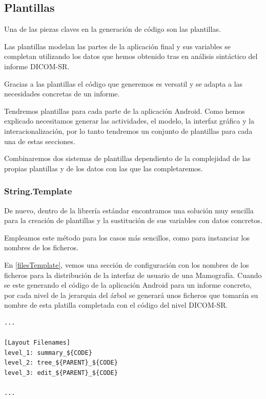 \subsection{Plantillas}\label{sec:templates}
Una de las piezas claves en la generación de código son las plantillas.\par
Las plantillas modelan las partes de la aplicación final y sus variables se completan utilizando los datos que hemos obtenido tras en análisis sintáctico del informe DICOM-SR.\medskip\par

Gracias a las plantillas el código que generemos es versatil y se adapta a las necesidades concretas de un informe. \par
Tendremos plantillas para cada parte de la aplicación Android. Como hemos explicado necesitamos generar las actividades, el modelo, la interfaz gráfica y la interacionalización, por lo tanto tendremos un conjunto de plantillas para cada una de estas secciones.\medskip\par

Combinaremos dos sistemas de plantillas dependiento de la complejidad de las propias plantillas y de los datos con las que las completaremos.\par

\subsubsection{String.Template}
De nuevo, dentro de la librería estándar encontramos una solución muy sencilla para la creación de plantillas y la sustitución de sus variables con datos concretos.\par
Empleamos este método para los casos más sencillos, como para instanciar los nombres de los ficheros.\medskip\par
En \ref{filesTemplate}, vemos una sección de configuración con los nombres de los ficheros para la distribución de la interfaz de usuario de una Mamografía. Cuando se este generando el código de la aplicación Android para un informe concreto, por cada nivel de la jerarquia del árbol se generará unos ficheros que tomarán su nombre de esta platilla completada con el código del nivel DICOM-SR.\par

\begin{lstlisting}[label=filesTemplate,caption=Sección de la configuración con los nombres de los ficheros]
...

[Layout Filenames]
level_1: summary_${CODE}
level_2: tree_${PARENT}_${CODE}
level_3: edit_${PARENT}_${CODE}

...
\end{lstlisting}

